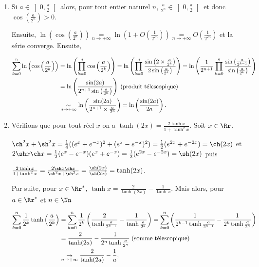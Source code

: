 {{\begin{enumerate}
\item  Si $a\in\left]0,\frac{\pi}{2}\right[$ alors, pour tout entier naturel $n$, $\frac{a}{2^n}\in\left]0,\frac{\pi}{2}\right[$ et donc $\cos\left(\frac{a}{2^n}\right)>0$.

Ensuite, $\ln\left(\cos\left(\frac{a}{2^n}\right)\right)\underset{n\rightarrow+\infty}{=}\ln\left(1+O\left(\frac{1}{2^{2n}}\right)\right)\underset{n\rightarrow+\infty}{=}O\left(\frac{1}{2^{2n}}\right)$ et la série converge. Ensuite,

\begin{align*}\ensuremath
\sum_{k=0}^{n}\ln\left(\cos\left(\frac{a}{2^k}\right)\right)&=\ln\left(\prod_{k=0}^{n}\cos\left(\frac{a}{2^k}\right)\right)=\ln\left(\prod_{k=0}^{n}\frac{\sin\left(2\times\frac{a}{2^k}\right)}{2\sin\left(\frac{a}{2^k}\right)}\right)=\ln\left(\frac{1}{2^{n+1}}\prod_{k=0}^{n}\frac{\sin\left(\frac{a}{2^{k-1}}\right)}{\sin\left(\frac{a}{2^k}\right)}\right)\\
 &=\ln\left(\frac{\sin(2a)}{2^{n+1}\sin\left(\frac{a}{2^n}\right)}\right)\;(\text{produit télescopique})\\
 &\underset{n\rightarrow+\infty}{\sim}\ln\left(\frac{\sin(2a)}{2^{n+1}\times\frac{a}{2^n}}\right)=\ln\left(\frac{\sin(2a)}{2a}\right).
\end{align*}

\begin{center}
\shadowbox{
$\forall a\in\left]0,\frac{\pi}{2}\right[$, $\sum_{n=0}^{+\infty}\ln\left(\cos\left(\frac{a}{2^n}\right)\right)=\ln\left(\frac{\sin(2a)}{2a}\right)$.
}
\end{center}

\item  Vérifions que pour tout réel $x$ on a $\tanh(2x)=\frac{2\tanh x}{1+\tanh^2x}$. Soit $x\in\Rr$.

$\ch^2x+\sh^2x=\frac{1}{4}((e^x+e^{-x})^2+(e^x-e^{-x})^2)=\frac{1}{2}(e^{2x}+e^{-2x})=\ch(2x)$ et $2\sh x\ch x=\frac{1}{2}(e^{x}-e^{-x})(e^x+e^{-x})=\frac{1}{2}(e^{2x}-e^{-2x})=\sh(2x)$ puis

\begin{center}
$\frac{2\tanh x}{1+\tanh^2x}=\frac{2\sh x\ch x}{\ch^2x+\sh^2x}=\frac{\sh(2x)}{\ch(2x)}=\tanh(2x)$.
\end{center}

Par suite, pour $x\in\Rr^*$, $\tanh x=\frac{2}{\tanh(2x)}-\frac{1}{\tanh x}$. Mais alors, pour $a\in\Rr^*$ et $n\in\Nn$

\begin{align*}\ensuremath
\sum_{k=0}^{n}\frac{1}{2^k}\tanh\left(\frac{a}{2^k}\right)&=\sum_{k=0}^{n}\frac{1}{2^k}\left(\frac{2}{\tanh\frac{a}{2^{k-1}}}-\frac{1}{\tanh\frac{a}{2^{k}}}\right)=\sum_{k=0}^{n}\left(\frac{1}{2^{k-1}\tanh\frac{a}{2^{k-1}}}-\frac{1}{2^k\tanh\frac{a}{2^{k}}}\right)\\
 &=\frac{2}{\tanh(2a)}-\frac{1}{2^n\tanh\frac{a}{2^{n}}}\;(\text{somme télescopique})\\
 &\underset{n\rightarrow+\infty}{\rightarrow}\frac{2}{\tanh(2a)}-\frac{1}{a},
\end{align*}


\end{enumerate}}}
